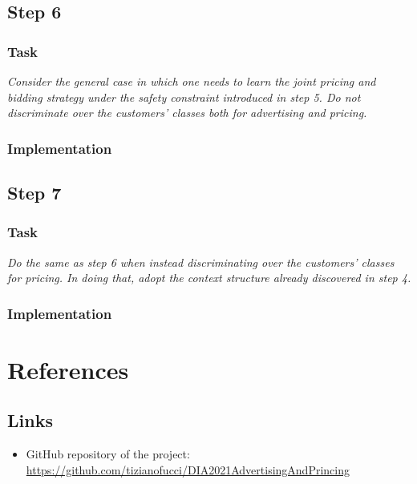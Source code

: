 \documentclass[12pt,a4paper]{report}
\begin{document}
		\section{Step 6}
			\subsection{Task}
\textit{Consider the general case in which one needs to learn the joint pricing and bidding strategy under the safety constraint introduced in step 5. Do not discriminate over the customers’ classes both for advertising and pricing.}
			\subsection{Implementation}
		\section{Step 7}
			\subsection{Task}
\textit{Do the same as step 6 when instead discriminating over the customers’ classes for pricing. In doing that, adopt the context structure already discovered in step 4.}
			\subsection{Implementation}
	\chapter{References}
		\section{Links}

\begin{itemize}
	\item GitHub repository of the project: \url{https://github.com/tizianofucci/DIA2021AdvertisingAndPrincing}
\end{itemize}
\end{document}

